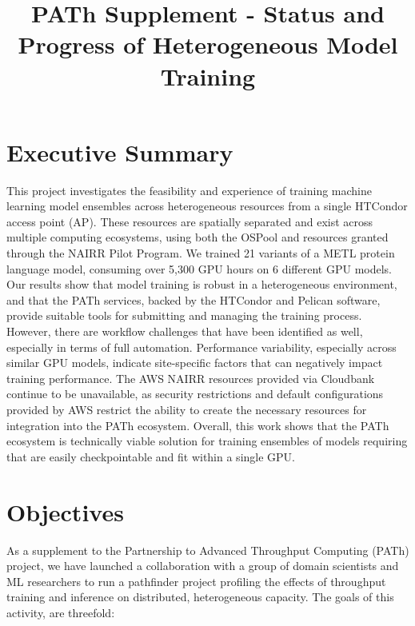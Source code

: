 \documentclass{article}
\title{PATh Supplement - Status and Progress of Heterogeneous Model
  Training}\label{path-supplement---status-and-progress-of-hetergeneous-model-training}
\begin{document}
\maketitle

\section{Executive Summary}\label{executive-summary}
This project investigates the feasibility and experience of training machine
learning model ensembles across heterogeneous resources from a single HTCondor
access point (AP). These resources are spatially separated and exist across
multiple computing ecosystems, using both the OSPool and resources granted
through the NAIRR Pilot Program. We trained 21 variants of a METL
protein language model, consuming over 5,300 GPU hours on 6 different GPU
models. Our results show that model training is robust in a heterogeneous
environment, and that the PATh services, backed by the HTCondor and Pelican
software, provide suitable tools for submitting and managing the training
process. However, there are workflow challenges that have been identified as
well, especially in terms of full automation. Performance variability,
especially across similar GPU models, indicate site-specific factors that can
negatively impact training performance. The AWS NAIRR resources provided via
Cloudbank continue to be unavailable, as security restrictions and default
configurations provided by AWS restrict the ability to create the necessary
resources for integration into the PATh ecosystem. Overall, this work shows that
the PATh ecosystem is technically viable solution for training ensembles of
models requiring that are easily checkpointable and fit within a single GPU.


\section{Objectives}\label{objectives}

As a supplement to the Partnership to Advanced Throughput Computing
(PATh) project, we have launched a collaboration with a group of
domain scientists and ML researchers to run a pathfinder project
profiling the effects of throughput training and inference on
distributed, heterogeneous capacity. The goals of this activity, are
threefold:
\end{document}
